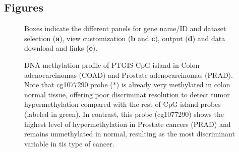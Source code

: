 \documentclass{bmcart}
\begin{document}
\begin{backmatter}



\section*{Figures}

\begin{figure}[h!]
  \caption{
    Boxes indicate the different panels for gene name/ID and dataset selection (\textbf{a}), view customization (\textbf{b} and \textbf{c}), output (\textbf{d}) and data download and links (\textbf{e}).
  }
  \label{fig:1}
\end{figure}


\begin{figure}[h!]
  \caption{
    DNA methylation profile of PTGIS CpG island in Colon adenocarcinomas (COAD) and Prostate adenocarcinomas (PRAD). Note that cg1077290 probe (*) is already very methylated in colon normal tissue, offering poor discriminat resolution to detect tumor hypermethylation compared with the rest of CpG island probes (labeled in green). In contrast, this probe (cg1077290) shows the highest level of hypermethylation in Prostate cancers (PRAD) and remains unmethylated in normal, resulting as the most discriminant variable in tis type of cancer.
  }
  \label{fig:2}
\end{figure}



\end{backmatter}
\end{document}
